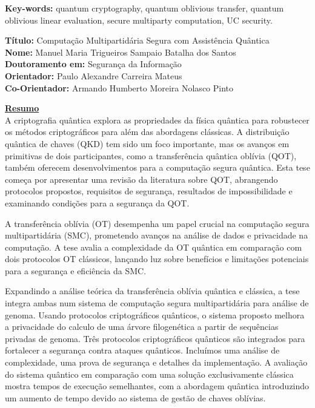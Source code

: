 \documentclass[12pt]{report}
\begin{document}
\vfill

\begin{flushleft}
\textbf{Key-words:} quantum cryptography, quantum oblivious transfer, quantum oblivious
linear evaluation, secure multiparty computation, UC security.
\end{flushleft}


\newpage


\noindent \textbf{T\'{i}tulo:} Computa\c{c}\~{a}o Multipartid\'{a}ria Segura com Assist\^{e}ncia Qu\^{a}ntica\\
\textbf{Nome:} Manuel Maria Trigueiros Sampaio Batalha dos Santos\\
\textbf{Doutoramento em:} Seguran\c{c}a da Informa\c{c}\~{a}o\\
\textbf{Orientador:} Paulo Alexandre Carreira Mateus\\
\textbf{Co-Orientador:} Armando Humberto Moreira Nolasco Pinto\\
\vspace{2\baselineskip}

\underline{\textbf{Resumo}}\\
A criptografia quântica explora as propriedades da física quântica para robustecer os métodos criptográficos para além das abordagens clássicas. A distribuição quântica de chaves (QKD) tem sido um foco importante, mas os avanços em primitivas de dois participantes, como a transferência quântica oblívia (QOT), também oferecem desenvolvimentos para a computação segura quântica. Esta tese começa por apresentar uma revisão da literatura sobre QOT, abrangendo protocolos propostos, requisitos de segurança, resultados de impossibilidade e examinando condições para a segurança da QOT.

A transferência oblívia (OT) desempenha um papel crucial na computação segura multipartidária (SMC), prometendo avanços na análise de dados e privacidade na computação. A tese avalia a complexidade da OT quântica em comparação com dois protocolos OT clássicos, lançando luz sobre benefícios e limitações potenciais para a segurança e eficiência da SMC.

Expandindo a análise teórica da transferência oblívia quântica e clássica, a tese integra ambas num sistema de computação segura multipartidária para análise de genoma. Usando protocolos criptográficos quânticos, o sistema proposto melhora a privacidade do calculo de uma árvore filogenética a partir de sequências privadas de genoma. Três protocolos criptográficos quânticos são integrados para fortalecer a segurança contra ataques quânticos. Incluímos uma análise de complexidade, uma prova de segurança e detalhes da implementação. A avaliação do sistema quântico em comparação com uma solução exclusivamente clássica mostra tempos de execução semelhantes, com a abordagem quântica introduzindo um aumento de tempo devido ao sistema de gestão de chaves oblívias.
\end{document}
